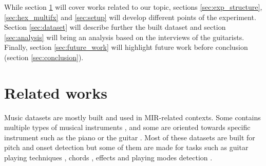 \documentclass{article}
\begin{document}
While section \ref{sec:related_works} will cover works related to our topic, sections \ref{sec:exp_structure}, \ref{sec:hex_multifx} and \ref{sec:setup} will develop different points of the experiment. Section \ref{sec:dataset} will describe further the built dataset and section \ref{sec:analysis} will bring an analysis based on the interviews of the guitarists.
Finally, section \ref{sec:future_work} will highlight future work before conclusion (section \ref{sec:conclusion}).



\section{Related works}\label{sec:related_works}


Music datasets are mostly built and used in MIR-related contexts.  Some contains multiple types of musical instruments \cite{thickstun2017learning}, and some are oriented towards specific instrument such as the piano \cite{Emiya2010MAPS, hawthorne2018} or the guitar \cite{Kehling2014, sci:Xi2018}. Most of these datasets are built for pitch and onset detection but some of them are made for tasks such as guitar playing techniques \cite{sci:Su2014a}, chords \cite{nadar2019Chords}, effects \cite{Stein2010} and playing modes detection \cite{Foulon2014}. 
\end{document}
